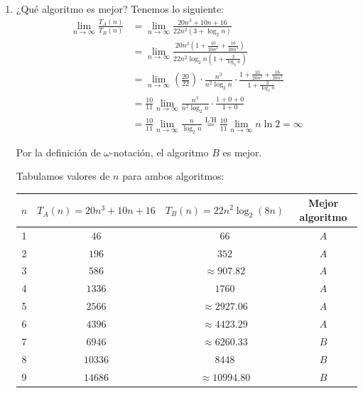 \begin{enumerate}
    \item ¿Qué algoritmo es mejor? Tenemos lo siguiente:
    \begin{align*}
        \lim_{n \to \infty} \frac{T_A(n)}{T_B(n)} &= \lim_{n \to \infty} \frac{20n^3 + 10n + 16}{22n^2(3 + \log_2 n)} \\
        &= \lim_{n \to \infty} \frac{20n^3 \left(1 + \frac{10}{20n^2} + \frac{16}{20n^3}\right)}{22n^2 \log_2 n \left(1 + \frac{3}{\log_2 n}\right)} \\
        &= \lim_{n \to \infty} \left(\frac{20}{22}\right) \cdot \frac{n^3}{n^2 \log_2 n} \cdot \frac{1 + \frac{10}{20n^2} + \frac{16}{20n^3}}{1 + \frac{3}{\log_2 n}} \\
        &= \frac{10}{11} \lim_{n \to \infty} \frac{n^3}{n^2 \log_2 n} \cdot \frac{1 + 0 + 0}{1 + 0} \\
        &= \frac{10}{11} \lim_{n \to \infty} \frac{n}{\log_2 n} \stackrel{\text{L'H}}{=} \frac{10}{11} \lim_{n \to \infty} n \ln 2 = \infty
    \end{align*}

    Por la definición de $\omega$-notación, el algoritmo $B$ es mejor.
    
    \vspace{2em}
    Tabulamos valores de $n$ para ambos algoritmos:
    
    \begin{center}
    \begin{tabular}{|c|c|c|c|}
    \hline
    $n$ & $T_A(n) = 20n^3 + 10n + 16$ & $T_B(n) = 22n^2 \log_2(8n)$ & Mejor algoritmo \\ \hline
    1 & $46$ & $66$ & $A$ \\ \hline
    2 & $196$ & $352$ & $A$ \\ \hline
    3 & $586$ & $\approx 907.82$ & $A$ \\ \hline
    4 & $1336$ & $1760$ & $A$ \\ \hline
    5 & $2566$ & $\approx 2927.06$ & $A$ \\ \hline
    6 & $4396$ & $\approx 4423.29$ & $A$ \\ \hline
    7 & $6946$ & $\approx 6260.33$ & $B$ \\ \hline
    8 & $10336$ & $8448$ & $B$ \\ \hline
    9 & $14686$ & $\approx 10994.80$ & $B$ \\ \hline
    \end{tabular}
    \end{center}


\end{enumerate}
